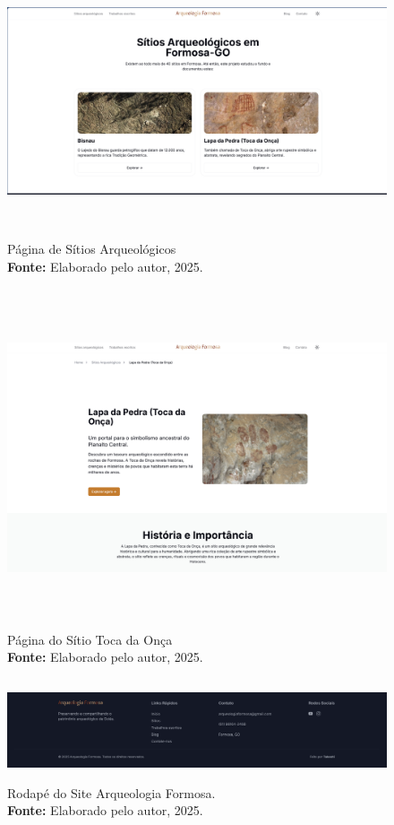 \begin{figure}[H]
    \centering
    \includegraphics[height=8cm, keepaspectratio]{img/site/sitios arqueologicos.png}
    \caption{Página de Sítios Arqueológicos \\
    \textbf{Fonte:} Elaborado pelo autor, 2025.}
    \label{fig:pagina_sitiosarqueologicos}
\end{figure}



\begin{figure}[H]
    \centering
    \includegraphics[height=10cm, keepaspectratio]{img/site/pagina_toca_da_onca.png}
    \caption{Página do Sítio Toca da Onça \\
    \textbf{Fonte:} Elaborado pelo autor, 2025.}
    \label{fig:pagina_tocadaonca}
\end{figure}


\begin{figure}[H]
    \centering
    \includegraphics[height=3cm, keepaspectratio]{img/site/footer.png}
    \caption{Rodapé do Site Arqueologia Formosa. \\
    \textbf{Fonte:} Elaborado pelo autor, 2025.}
    \label{fig:footer}
\end{figure}

